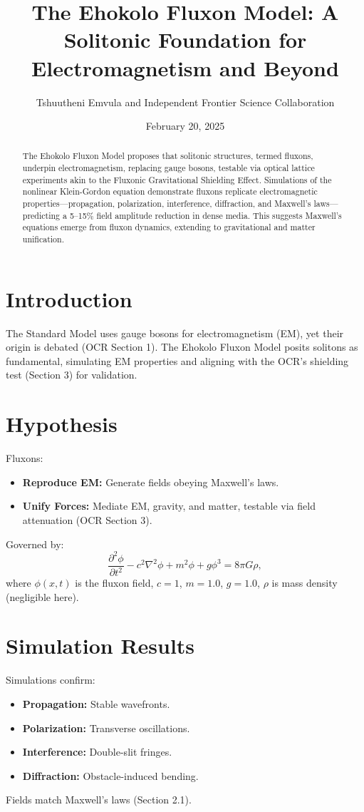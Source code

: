 \documentclass{article}
\title{The Ehokolo Fluxon Model: A Solitonic Foundation for Electromagnetism and Beyond}
\author{Tshuutheni Emvula and Independent Frontier Science Collaboration}
\date{February 20, 2025}
\begin{document}
\maketitle

\begin{abstract}
The Ehokolo Fluxon Model proposes that solitonic structures, termed fluxons, underpin electromagnetism, replacing gauge bosons, testable via optical lattice experiments akin to the Fluxonic Gravitational Shielding Effect. Simulations of the nonlinear Klein-Gordon equation demonstrate fluxons replicate electromagnetic properties—propagation, polarization, interference, diffraction, and Maxwell’s laws—predicting a 5–15\% field amplitude reduction in dense media. This suggests Maxwell’s equations emerge from fluxon dynamics, extending to gravitational and matter unification.
\end{abstract}

\section{Introduction}
The Standard Model uses gauge bosons for electromagnetism (EM), yet their origin is debated (OCR Section 1). The Ehokolo Fluxon Model posits solitons as fundamental, simulating EM properties and aligning with the OCR’s shielding test (Section 3) for validation.

\section{Hypothesis}
Fluxons:
\begin{itemize}
    \item \textbf{Reproduce EM:} Generate fields obeying Maxwell’s laws.
    \item \textbf{Unify Forces:} Mediate EM, gravity, and matter, testable via field attenuation (OCR Section 3).
\end{itemize}
Governed by:
\begin{equation}
\frac{\partial^2 \phi}{\partial t^2} - c^2 \nabla^2 \phi + m^2 \phi + g \phi^3 = 8 \pi G \rho,
\end{equation}
where \(\phi(x,t)\) is the fluxon field, \(c = 1\), \(m = 1.0\), \(g = 1.0\), \(\rho\) is mass density (negligible here).

\section{Simulation Results}
Simulations confirm:
\begin{itemize}
    \item \textbf{Propagation:} Stable wavefronts.
    \item \textbf{Polarization:} Transverse oscillations.
    \item \textbf{Interference:} Double-slit fringes.
    \item \textbf{Diffraction:} Obstacle-induced bending.
\end{itemize}
Fields match Maxwell’s laws (Section 2.1).
\end{document}
